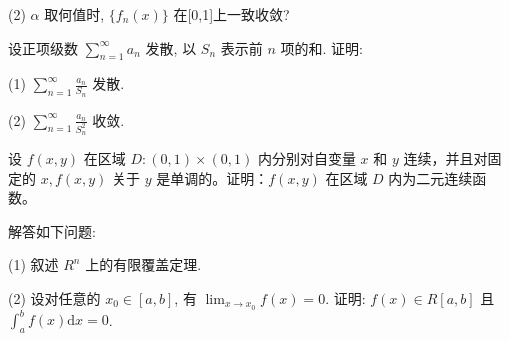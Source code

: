 (2) $\alpha$ 取何值时, $\{f_n(x)\}$ 在[0,1]上一致收敛?\par
设正项级数 $\sum_{n=1}^{\infty} a_n$ 发散, 以 $S_n$ 表示前 $n$ 项的和. 证明:\par
(1) $\sum_{n=1}^{\infty} \frac{a_n}{S_n}$ 发散.\par
(2) $\sum_{n=1}^{\infty} \frac{a_n}{S_n^2}$ 收敛.\par
设 $f(x, y)$ 在区域 $D: (0, 1) \times (0, 1)$ 内分别对自变量 $x$ 和 $y$ 连续，并且对固定的 $x, f(x, y)$ 关于 $y$ 是单调的。证明：$f(x, y)$ 在区域 $D$ 内为二元连续函数。\par
解答如下问题:\par
(1) 叙述  $R^{n}$  上的有限覆盖定理.\par
(2) 设对任意的 $x_0 \in [a, b]$, 有 $\lim_{x \to x_0} f(x) = 0$. 证明: $f(x) \in R[a, b]$ 且 $\int_{a}^{b} f(x) \mathrm{d}x = 0$.\par
